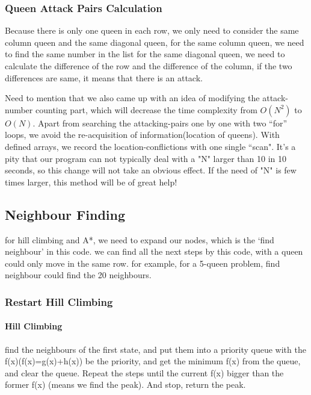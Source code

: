 \documentclass[11pt, a4paper]{article}
\begin{document}
\subsubsection{Queen Attack Pairs Calculation}

 Because there is only one queen in each row, we only need to consider the same column queen and the same diagonal queen, for the same column queen, we need to find the same number in the list
for the same diagonal queen, we need to calculate the difference of the row and the difference of the column, if the two differences are same, it means that there is an attack.

Need to mention that we also came up with an idea of modifying the attack-number counting part, which will decrease the time complexity from $O(N^2)$ to $O(N)$. Apart from searching the attacking-pairs one by one with two “for” loops, we avoid the re-acquisition of information(location of queens). With defined arrays, we record the location-conflictions with one single “scan".
It’s a pity that our program can not typically deal with a "N" larger than 10 in 10 seconds, so this change will not take an obvious effect. If the need of "N" is few times larger, this method will be of great help!

\subsection{Neighbour Finding}

for hill climbing and A*, we need to expand our nodes, which is the ‘find neighbour’ in this code. we can find all the next steps by this code, with a queen could only move in the same row. for example, for a 5-queen problem, find neighbour could find the 20 neighbours.


\subsubsection{Restart Hill Climbing}

\paragraph{Hill Climbing}


find the neighbours of the first state, and put them into a priority queue with the f(x)(f(x)=g(x)+h(x)) be the priority, and get the minimum f(x) from the queue, and clear the queue. Repeat the steps until the current f(x) bigger than the former f(x) (means we find the peak). And stop, return the peak.
\end{document}
